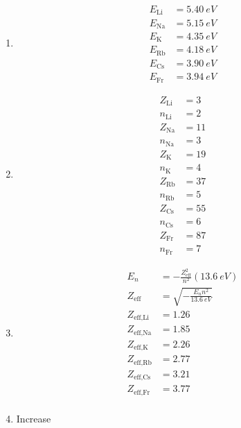 \documentclass{article}
\begin{document}
\begin{enumerate}
  \item

        \begin{align*}
          E_\text{Li} & = \qty{5.40}{eV} \\
          E_\text{Na} & = \qty{5.15}{eV} \\
          E_\text{K}  & = \qty{4.35}{eV} \\
          E_\text{Rb} & = \qty{4.18}{eV} \\
          E_\text{Cs} & = \qty{3.90}{eV} \\
          E_\text{Fr} & = \qty{3.94}{eV}
        \end{align*}

  \item

        \begin{align*}
          Z_\text{Li} & = 3  \\
          n_\text{Li} & = 2  \\
          Z_\text{Na} & = 11 \\
          n_\text{Na} & = 3  \\
          Z_\text{K}  & = 19 \\
          n_\text{K}  & = 4  \\
          Z_\text{Rb} & = 37 \\
          n_\text{Rb} & = 5  \\
          Z_\text{Cs} & = 55 \\
          n_\text{Cs} & = 6  \\
          Z_\text{Fr} & = 87 \\
          n_\text{Fr} & = 7
        \end{align*}

  \item

        \begin{align*}
          E_n             & = -\frac{Z_\text{eff}^2}{n^2} (\qty{13.6}{eV}) \\
          Z_\text{eff}    & = \sqrt{-\frac{E_n n^2}{\qty{13.6}{eV}}}       \\
          Z_\text{eff,Li} & = 1.26                                         \\
          Z_\text{eff,Na} & = 1.85                                         \\
          Z_\text{eff,K}  & = 2.26                                         \\
          Z_\text{eff,Rb} & = 2.77                                         \\
          Z_\text{eff,Cs} & = 3.21                                         \\
          Z_\text{eff,Fr} & = 3.77                                         \\
        \end{align*}

  \item Increase
\end{enumerate}
\end{document}
